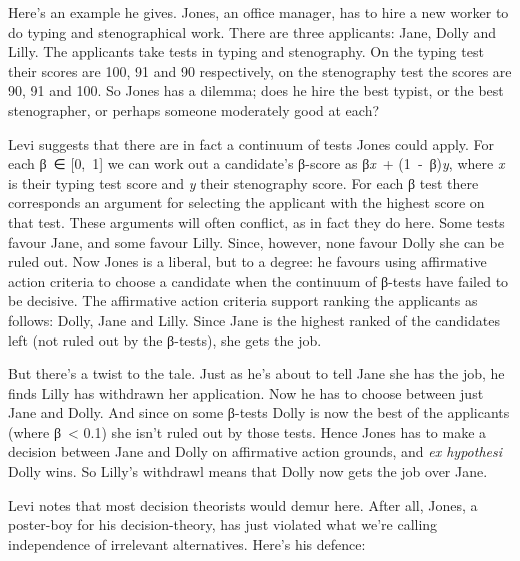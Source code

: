 \documentclass[
  10pt,
  letterpaper,
  DIV=11,
  numbers=noendperiod,
  twoside]{scrartcl}
\begin{document}
Here's an example he gives. Jones, an office manager, has to hire a new
worker to do typing and stenographical work. There are three applicants:
Jane, Dolly and Lilly. The applicants take tests in typing and
stenography. On the typing test their scores are 100, 91 and 90
respectively, on the stenography test the scores are 90, 91 and 100. So
Jones has a dilemma; does he hire the best typist, or the best
stenographer, or perhaps someone moderately good at each?

Levi suggests that there are in fact a continuum of tests Jones could
apply. For each β~∈ {[}0,~1{]} we can work out a candidate's β-score as
β\emph{x}~+ (1~‑~β)\emph{y}, where \emph{x} is their typing test score
and \emph{y} their stenography score. For each β test there corresponds
an argument for selecting the applicant with the highest score on that
test. These arguments will often conflict, as in fact they do here. Some
tests favour Jane, and some favour Lilly. Since, however, none favour
Dolly she can be ruled out. Now Jones is a liberal, but to a degree: he
favours using affirmative action criteria to choose a candidate when the
continuum of β-tests have failed to be decisive. The affirmative action
criteria support ranking the applicants as follows: Dolly, Jane and
Lilly. Since Jane is the highest ranked of the candidates left (not
ruled out by the β-tests), she gets the job.

But there's a twist to the tale. Just as he's about to tell Jane she has
the job, he finds Lilly has withdrawn her application. Now he has to
choose between just Jane and Dolly. And since on some β-tests Dolly is
now the best of the applicants (where β~\textless{} 0.1) she isn't ruled
out by those tests. Hence Jones has to make a decision between Jane and
Dolly on affirmative action grounds, and \emph{ex hypothesi} Dolly wins.
So Lilly's withdrawl means that Dolly now gets the job over Jane.

Levi notes that most decision theorists would demur here. After all,
Jones, a poster-boy for his decision-theory, has just violated what
we're calling independence of irrelevant alternatives. Here's his
defence:
\end{document}
